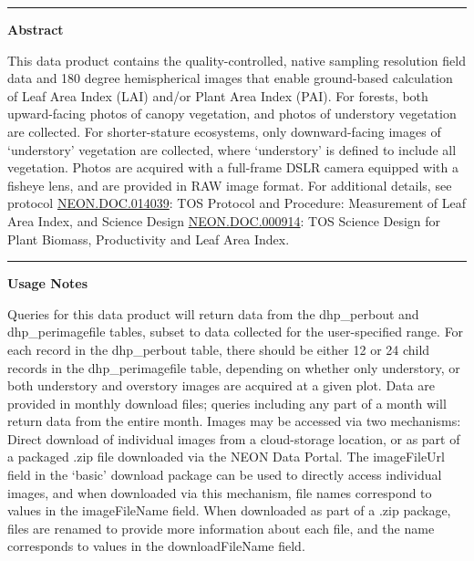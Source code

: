 \documentclass[]{article}
\begin{document}
\begin{center}\rule{0.5\linewidth}{\linethickness}\end{center}

\textbf{Abstract}

This data product contains the quality-controlled, native sampling
resolution field data and 180 degree hemispherical images that enable
ground-based calculation of Leaf Area Index (LAI) and/or Plant Area
Index (PAI). For forests, both upward-facing photos of canopy
vegetation, and photos of understory vegetation are collected. For
shorter-stature ecosystems, only downward-facing images of `understory'
vegetation are collected, where `understory' is defined to include all
vegetation. Photos are acquired with a full-frame DSLR camera equipped
with a fisheye lens, and are provided in RAW image format. For
additional details, see protocol
\href{http://data.neonscience.org/api/v0/documents/NEON.DOC.014039vH}{NEON.DOC.014039}:
TOS Protocol and Procedure: Measurement of Leaf Area Index, and Science
Design
\href{http://data.neonscience.org/api/v0/documents/NEON.DOC.000914vA}{NEON.DOC.000914}:
TOS Science Design for Plant Biomass, Productivity and Leaf Area Index.

\begin{center}\rule{0.5\linewidth}{\linethickness}\end{center}

\textbf{Usage Notes}

Queries for this data product will return data from the dhp\_perbout and
dhp\_perimagefile tables, subset to data collected for the
user-specified range. For each record in the dhp\_perbout table, there
should be either 12 or 24 child records in the dhp\_perimagefile table,
depending on whether only understory, or both understory and overstory
images are acquired at a given plot. Data are provided in monthly
download files; queries including any part of a month will return data
from the entire month. Images may be accessed via two mechanisms: Direct
download of individual images from a cloud-storage location, or as part
of a packaged .zip file downloaded via the NEON Data Portal. The
imageFileUrl field in the `basic' download package can be used to
directly access individual images, and when downloaded via this
mechanism, file names correspond to values in the imageFileName field.
When downloaded as part of a .zip package, files are renamed to provide
more information about each file, and the name corresponds to values in
the downloadFileName field.
\end{document}

